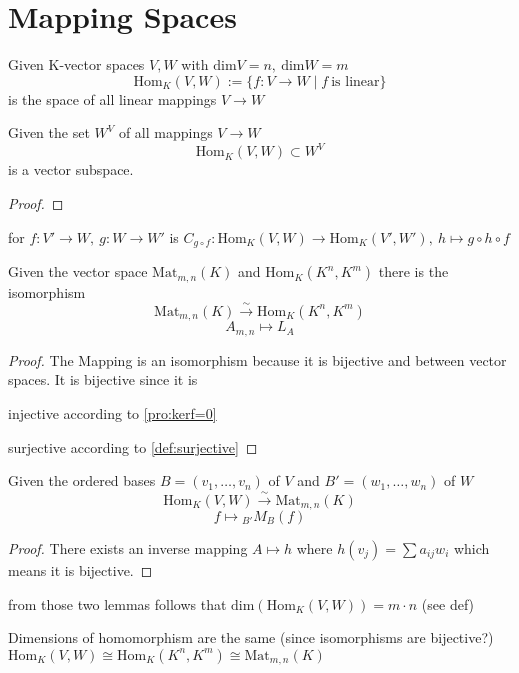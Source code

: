 \section{Mapping Spaces}
\begin{definition}
   Given K-vector spaces \(V, W\) with \(\text{dim}V = n,~\text{dim}W = m\)
   \[\text{Hom}_K(V, W) := \{f: V \to W \mid f~\text{is linear}\}\]
   is the space of all linear mappings \(V \to W\)
\end{definition}

\begin{lemma}
   Given the set \(W^V\) of all mappings \(V \to W\)
   \[\text{Hom}_K(V, W) \subset W^V\]
   is a vector subspace.
\end{lemma}
\begin{proof}
\end{proof}
for \(f: V' \to W,~g: W \to W'\) is \(C_{g \circ f}: \text{Hom}_K(V, W) \to \text{Hom}_K(V', W'),~h \mapsto g \circ h \circ f\)

\begin{lemma}
   Given the vector space \(\text{Mat}_{m,n}(K)\) and \(\text{Hom}_K(K^n, K^m)\) there is the isomorphism
   \[\text{Mat}_{m,n}(K) \xrightarrow{\sim} \text{Hom}_K(K^n, K^m)\]
   \[A_{m,n} \mapsto L_A\]
\end{lemma}
\begin{proof}
   The Mapping is an isomorphism because it is bijective and between vector spaces. It is bijective since it is

   injective according to \cref{pro:kerf=0}

   surjective according to \cref{def:surjective}
\end{proof}

\begin{lemma}
   Given the ordered bases \(B = (v_1, \ldots, v_n)\) of \(V\) and \(B' = (w_1, \ldots, w_n)\) of \(W\)
   \[\text{Hom}_K(V, W) \xrightarrow{\sim} \text{Mat}_{m,n}(K)\]
   \[f \mapsto {}_{B'}M_{B}(f)\]
\end{lemma}
\begin{proof}
   There exists an inverse mapping \(A \mapsto h\) where \(h(v_j) = \sum a_{ij} w_i\) which means it is bijective.
\end{proof}
\begin{proposition}[\(\text{dim}(\text{Hom}_K(V, W)) = m \cdot n\)]\label{pro:hom_dim}
   from those two lemmas follows that \(\text{dim}(\text{Hom}_K(V, W)) = m \cdot n\) (see def)
\end{proposition}
\begin{remark}
   Dimensions of homomorphism are the same (since isomorphisms are bijective?)
   \(\text{Hom}_K(V, W) \cong \text{Hom}_K(K^n, K^m) \cong \text{Mat}_{m,n}(K)\)
\end{remark}

